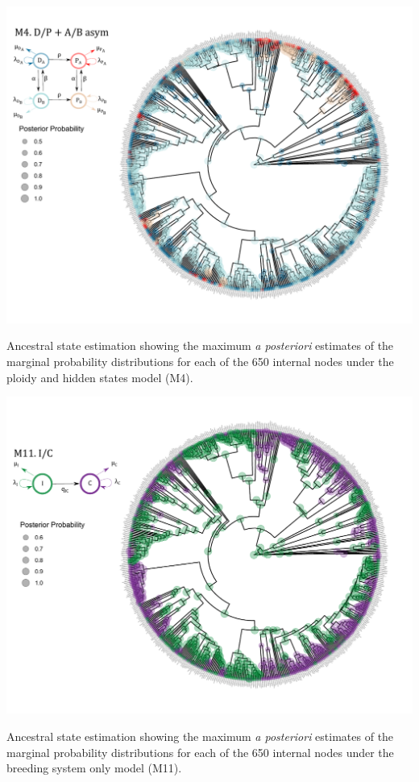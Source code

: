 \begin{suppfigure}
\includegraphics[width=\textwidth]{figS10.pdf}
\caption{Ancestral state estimation showing the maximum \emph{a posteriori} estimates of the marginal probability distributions for each of the 650 internal nodes under the ploidy and hidden states model (M4).} %
\label{suppfigure:DPnodipABasr}
\end{suppfigure}


\begin{suppfigure}
\includegraphics[width=\textwidth]{figS11.pdf}
\caption{Ancestral state estimation showing the maximum \emph{a posteriori} estimates of the marginal probability distributions for each of the 650 internal nodes under the  breeding system only model (M11).} %
\label{suppfigure:ICasr}
\end{suppfigure}



